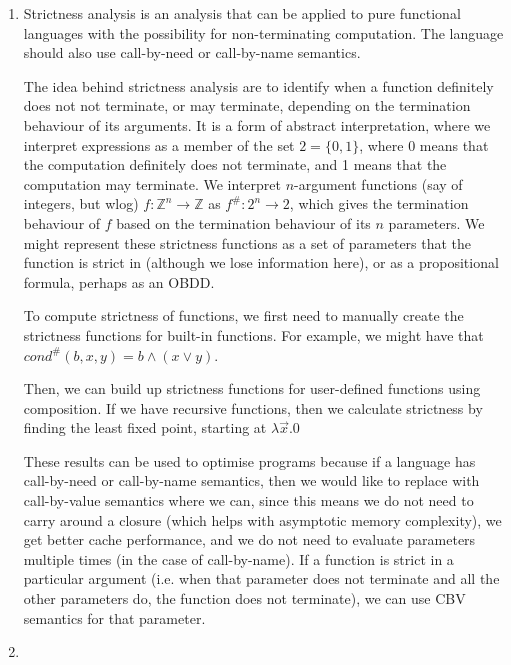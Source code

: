 


\begin{enumerate}[label=(\alph*)]
  \item
    Strictness analysis is an analysis that can be applied to pure functional languages with the possibility for non-terminating computation. The language should also use call-by-need or call-by-name semantics.

    The idea behind strictness analysis are to identify when a function definitely does not not terminate, or may terminate, depending on the termination behaviour of its arguments. It is a form of abstract interpretation, where we interpret expressions as a member of the set $2 = \{0,1\}$, where 0 means that the computation definitely does not terminate, and 1 means that the computation may terminate. We interpret $n$-argument functions (say of integers, but wlog) $f : \mathbb{Z}^n \rightarrow \mathbb{Z}$ as $f^{\#} : 2^n \rightarrow 2$, which gives the termination behaviour of $f$ based on the termination behaviour of its $n$ parameters. We might represent these strictness functions as a set of parameters that the function is strict in (although we lose information here), or as a propositional formula, perhaps as an OBDD.

    To compute strictness of functions, we first need to manually create the strictness functions for built-in functions. For example, we might have that $cond^{\#}(b, x, y) = b \wedge (x \vee y)$.

    Then, we can build up strictness functions for user-defined functions using composition. If we have recursive functions, then we calculate strictness by finding the least fixed point, starting at $\lambda \vec{x}. 0$

    These results can be used to optimise programs because if a language has call-by-need or call-by-name semantics, then we would like to replace with call-by-value semantics where we can, since this means we do not need to carry around a closure (which helps with asymptotic memory complexity), we get better cache performance, and we do not need to evaluate parameters multiple times (in the case of call-by-name). If a function is strict in a particular argument (i.e. when that parameter does not terminate and all the other parameters do, the function does not terminate), we can use CBV semantics for that parameter.

  \item
    \begin{enumerate}[label=(\roman*)]


\end{enumerate}
\end{enumerate}
